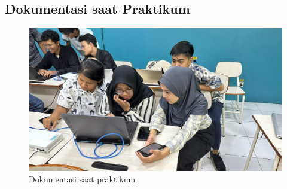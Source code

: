 \subsection{Dokumentasi saat Praktikum}
\begin{figure}[H]
	\centering
	\includegraphics[width=0.75\linewidth]{P3/img/dokumpraktikum.jpg}
	\caption{Dokumentasi saat praktikum}
	\label{fig:gambar32}
\end{figure}